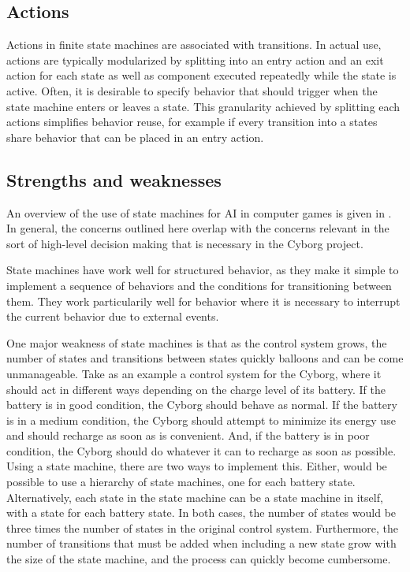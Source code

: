\documentclass[\rootfolder/main.tex]{subfiles}
\begin{document}
\subsection{Actions}

Actions in finite state machines are associated with transitions.
In actual use, actions are typically modularized by splitting into an entry action and an exit action for each state as well as component executed repeatedly while the state is active.
Often, it is desirable to specify behavior that should trigger when the state machine enters or leaves a state.
This granularity achieved by splitting each actions simplifies behavior reuse, for example if every transition into a states share behavior that can be placed in an entry action.


\subsection{Strengths and weaknesses}
\label{sec:state_machine_strength_weaknesses}

An overview of the use of state machines for AI in computer games is given in \cite{Millington2009}.
In general, the concerns outlined here overlap with the concerns relevant in the sort of high-level decision making that is necessary in the Cyborg project.

State machines have work well for structured behavior, as they make it simple to implement a sequence of behaviors and the conditions for transitioning between them.
They work particularily well for behavior where it is necessary to interrupt the current behavior due to external events.

One major weakness of state machines is that as the control system grows, the number of states and transitions between states quickly balloons and can be come unmanageable.
Take as an example a control system for the Cyborg, where it should act in different ways depending on the charge level of its battery.
If the battery is in good condition, the Cyborg should behave as normal.
If the battery is in a medium condition, the Cyborg should attempt to minimize its energy use and should recharge as soon as is convenient.
And, if the battery is in poor condition, the Cyborg should do whatever it can to recharge as soon as possible.
Using a state machine, there are two ways to implement this.
Either, would be possible to use a hierarchy of state machines, one for each battery state.
Alternatively, each state in the state machine can be a state machine in itself, with a state for each battery state.
In both cases, the number of states would be three times the number of states in the original control system.
Furthermore, the number of transitions that must be added when including a new state grow with the size of the state machine, and the process can quickly become cumbersome.
\end{document}
